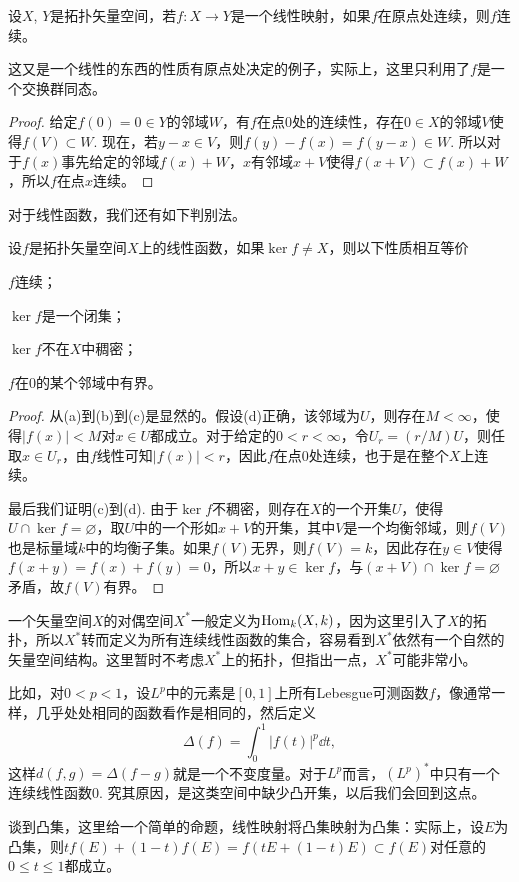 \begin{pro}
	设$X$, $Y$是拓扑矢量空间，若$f:X\to Y$是一个线性映射，如果$f$在原点处连续，则$f$连续。
\end{pro}

这又是一个线性的东西的性质有原点处决定的例子，实际上，这里只利用了$f$是一个交换群同态。

\begin{proof}
	给定$f(0)=0\in Y$的邻域$W$，有$f$在点$0$处的连续性，存在$0\in X$的邻域$V$使得$f(V)\subset W$. 现在，若$y-x\in V$，则$f(y)-f(x)=f(y-x)\in W$. 所以对于$f(x)$事先给定的邻域$f(x)+W$，$x$有邻域$x+V$使得$f(x+V)\subset f(x)+W$，所以$f$在点$x$连续。
\end{proof}

对于线性函数，我们还有如下判别法。

\begin{pro}
设$f$是拓扑矢量空间$X$上的线性函数，如果$\ker f\neq X$，则以下性质相互等价
\begin{compactenum}[(a)]
\item $f$连续；
\item $\ker f$是一个闭集；
\item $\ker f$不在$X$中稠密；
\item $f$在$0$的某个邻域中有界。
\end{compactenum}
\end{pro}

\begin{proof}
从(a)到(b)到(c)是显然的。假设(d)正确，该邻域为$U$，则存在$M< \infty$，使得$|f(x)|<M$对$x\in U$都成立。对于给定的$0<r<\infty$，令$U_r=(r/M)U$，则任取$x\in U_r$，由$f$线性可知$|f(x)|<r$，因此$f$在点$0$处连续，也于是在整个$X$上连续。

最后我们证明(c)到(d). 由于$\ker f$不稠密，则存在$X$的一个开集$U$，使得$U\cap \ker f=\varnothing$，取$U$中的一个形如$x+V$的开集，其中$V$是一个均衡邻域，则$f(V)$也是标量域$k$中的均衡子集。如果$f(V)$无界，则$f(V)=k$，因此存在$y\in V$使得$f(x+y)=f(x)+f(y)=0$，所以$x+y\in \ker f$，与$(x+V)\cap \ker f=\varnothing$矛盾，故$f(V)$有界。
\end{proof}

\begin{para}
	一个矢量空间$X$的对偶空间$X^*$一般定义为$\operatorname{Hom}_k(X,k)$，因为这里引入了$X$的拓扑，所以$X^*$转而定义为所有连续线性函数的集合，容易看到$X^*$依然有一个自然的矢量空间结构。这里暂时不考虑$X^*$上的拓扑，但指出一点，$X^*$可能非常小。

	比如，对$0<p<1$，设$L^p$中的元素是$[0,1]$上所有Lebesgue可测函数$f$，像通常一样，几乎处处相同的函数看作是相同的，然后定义
	\[
	\Delta(f)=\int_0^1 |f(t)|^p \dd t,
	\]
	这样$d(f,g)=\Delta(f-g)$就是一个不变度量。对于$L^p$而言，$(L^p)^*$中只有一个连续线性函数$0$. 究其原因，是这类空间中缺少凸开集，以后我们会回到这点。

	谈到凸集，这里给一个简单的命题，线性映射将凸集映射为凸集：实际上，设$E$为凸集，则$tf(E)+(1-t)f(E)=f(tE+(1-t)E)\subset f(E)$对任意的$0\leq t\leq 1$都成立。
\end{para}

